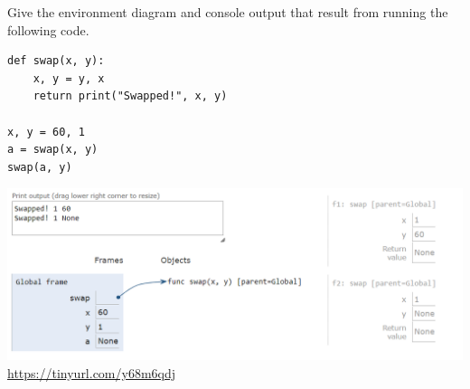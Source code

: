 \begin{blocksection}
\question Give the environment diagram and console output that result from running the following code.

\begin{lstlisting}
def swap(x, y):
    x, y = y, x
    return print("Swapped!", x, y)

x, y = 60, 1
a = swap(x, y)
swap(a, y)
\end{lstlisting}

\begin{solution}[2in]
\includegraphics[scale=0.5]{swap.png}
\\
\url{https://tinyurl.com/y68m6qdj}
\end{solution}
\end{blocksection}


